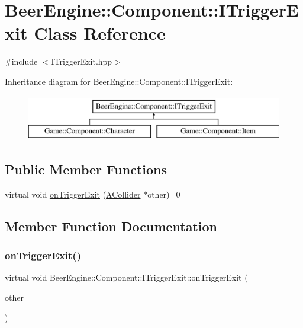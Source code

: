 \hypertarget{class_beer_engine_1_1_component_1_1_i_trigger_exit}{}\section{Beer\+Engine\+:\+:Component\+:\+:I\+Trigger\+Exit Class Reference}
\label{class_beer_engine_1_1_component_1_1_i_trigger_exit}


{\ttfamily \#include $<$I\+Trigger\+Exit.\+hpp$>$}

Inheritance diagram for Beer\+Engine\+:\+:Component\+:\+:I\+Trigger\+Exit\+:\begin{figure}[H]
\begin{center}
\leavevmode
\includegraphics[height=2.000000cm]{class_beer_engine_1_1_component_1_1_i_trigger_exit}
\end{center}
\end{figure}
\subsection*{Public Member Functions}
\begin{DoxyCompactItemize}
\item 
virtual void \mbox{\hyperlink{class_beer_engine_1_1_component_1_1_i_trigger_exit_ad5bc744f738cb2c52de40b243954967f}{on\+Trigger\+Exit}} (\mbox{\hyperlink{class_beer_engine_1_1_component_1_1_a_collider}{A\+Collider}} $\ast$other)=0
\end{DoxyCompactItemize}


\subsection{Member Function Documentation}
\mbox{\label{class_beer_engine_1_1_component_1_1_i_trigger_exit_ad5bc744f738cb2c52de40b243954967f}} 
\subsubsection{\texorpdfstring{on\+Trigger\+Exit()}{onTriggerExit()}}
{\footnotesize\ttfamily virtual void Beer\+Engine\+::\+Component\+::\+I\+Trigger\+Exit\+::on\+Trigger\+Exit (\begin{DoxyParamCaption}\item[{\mbox{\hyperlink{class_beer_engine_1_1_component_1_1_a_collider}{A\+Collider}} $\ast$}]{other }\end{DoxyParamCaption})\hspace{0.3cm}{\ttfamily [pure virtual]}}



